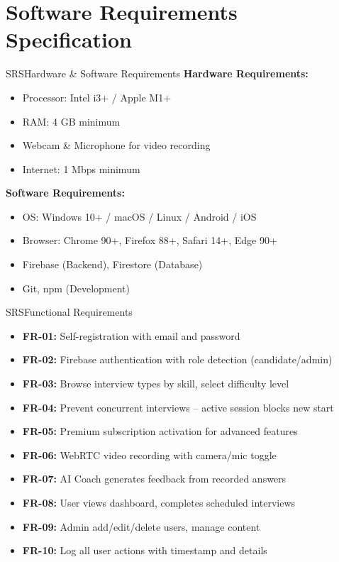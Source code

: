 \documentclass{beamer}
\begin{document}
\section{Software Requirements Specification}
\begin{frame}{SRS}{Hardware \& Software Requirements}
\textbf{Hardware Requirements:}
\begin{itemize}
    \item Processor: Intel i3+ / Apple M1+
    \item RAM: 4 GB minimum
    \item Webcam \& Microphone for video recording
    \item Internet: 1 Mbps minimum
\end{itemize}

\vspace{3pt}

\textbf{Software Requirements:}
\begin{itemize}
    \item OS: Windows 10+ / macOS / Linux / Android / iOS
    \item Browser: Chrome 90+, Firefox 88+, Safari 14+, Edge 90+
    \item Firebase (Backend), Firestore (Database)
    \item Git, npm (Development)
\end{itemize}
\end{frame}

\begin{frame}{SRS}{Functional Requirements}
\begin{itemize}
    \item \textbf{FR-01:} Self-registration with email and password
    \item \textbf{FR-02:} Firebase authentication with role detection (candidate/admin)
    \item \textbf{FR-03:} Browse interview types by skill, select difficulty level
    \item \textbf{FR-04:} Prevent concurrent interviews -- active session blocks new start
    \item \textbf{FR-05:} Premium subscription activation for advanced features
    \item \textbf{FR-06:} WebRTC video recording with camera/mic toggle
    \item \textbf{FR-07:} AI Coach generates feedback from recorded answers
    \item \textbf{FR-08:} User views dashboard, completes scheduled interviews
    \item \textbf{FR-09:} Admin add/edit/delete users, manage content
    \item \textbf{FR-10:} Log all user actions with timestamp and details
\end{itemize}
\end{frame}
\end{document}
